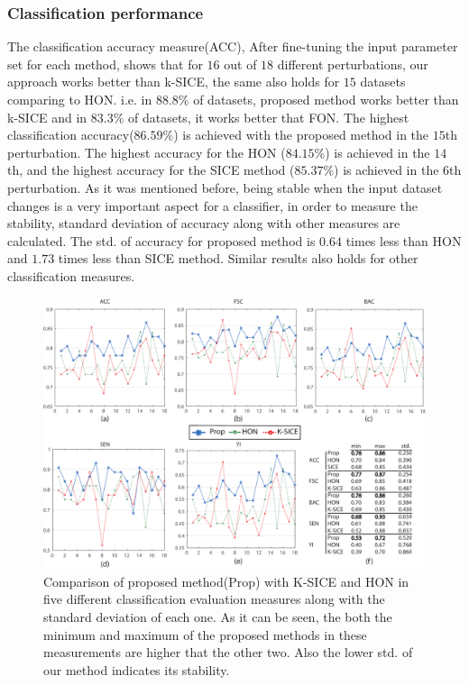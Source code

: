 \documentclass[journal]{IEEEtran}
\begin{document}
	\subsubsection{Classification performance}
	The classification accuracy measure(ACC), After fine-tuning the input parameter set for each method, shows that for $16$ out of $18$ different perturbations, our approach works better than k-SICE, the same also holds for $15$ datasets comparing to HON. i.e. in $88.8 \%$ of datasets, proposed method works better than k-SICE and in $83.3 \%$ of datasets, it works better that FON.  
	The highest classification accuracy($86.59\%$) is achieved with the proposed method in the $15$th perturbation. The highest accuracy for the HON ($84.15\%$) is achieved in the $14$th, and the highest accuracy for the SICE method ($85.37\%$) is achieved in the $6$th perturbation. As it was mentioned before, being stable when the input dataset changes is a very important aspect for a classifier, in order to measure the stability, standard deviation of accuracy along with other measures are
	calculated. The std. of accuracy for proposed method is $0.64$ times less than HON and $1.73$ times less than SICE method. Similar results also holds for other classification measures.
	\begin{figure}
		\centering
		\includegraphics[width=7in]{images/Final-eps.pdf}
		\caption{
			Comparison of proposed method(Prop) with K-SICE and HON in five different classification evaluation measures along with the standard deviation of each one. As it can be seen, the both the minimum and maximum of the proposed methods in these measurements are higher that the other two. Also the lower std. of our method indicates its stability.   
		}
		\label{g3.2}
	\end{figure}
	
\end{document}
